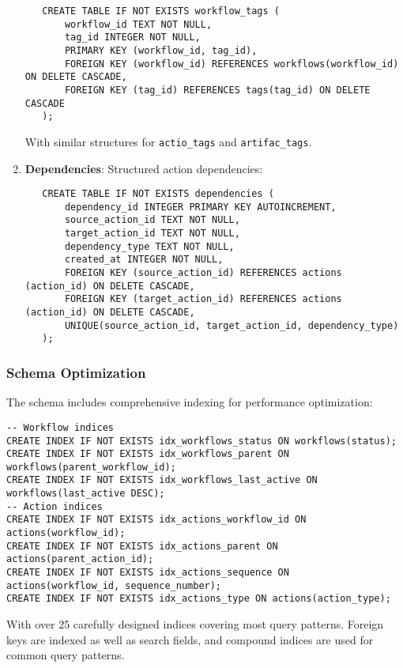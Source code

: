 \documentclass[12pt,a4paper]{article}
\newcommand{\code}[1]{\texttt{#1}}
\begin{document}
\begin{enumerate}[label=\arabic*.]
\begin{pageablecode}
\begin{verbatim}
   CREATE TABLE IF NOT EXISTS workflow_tags (
       workflow_id TEXT NOT NULL,
       tag_id INTEGER NOT NULL,
       PRIMARY KEY (workflow_id, tag_id),
       FOREIGN KEY (workflow_id) REFERENCES workflows(workflow_id) ON DELETE CASCADE,
       FOREIGN KEY (tag_id) REFERENCES tags(tag_id) ON DELETE CASCADE
   );
    \end{verbatim}
    \end{pageablecode}
    With similar structures for \code{actio\1\_tags} and \code{artifac\1\_tags}.

    \item \textbf{Dependencies}: Structured action dependencies:
    \begin{pageablecode}
    \begin{verbatim}
   CREATE TABLE IF NOT EXISTS dependencies (
       dependency_id INTEGER PRIMARY KEY AUTOINCREMENT,
       source_action_id TEXT NOT NULL,
       target_action_id TEXT NOT NULL,
       dependency_type TEXT NOT NULL,
       created_at INTEGER NOT NULL,
       FOREIGN KEY (source_action_id) REFERENCES actions (action_id) ON DELETE CASCADE,
       FOREIGN KEY (target_action_id) REFERENCES actions (action_id) ON DELETE CASCADE,
       UNIQUE(source_action_id, target_action_id, dependency_type)
   );
    \end{verbatim}
    \end{pageablecode}
\end{enumerate}

\subsubsection*{Schema Optimization}

The schema includes comprehensive indexing for performance optimization:
\begin{pageablecode}
\begin{verbatim}
-- Workflow indices
CREATE INDEX IF NOT EXISTS idx_workflows_status ON workflows(status);
CREATE INDEX IF NOT EXISTS idx_workflows_parent ON workflows(parent_workflow_id);
CREATE INDEX IF NOT EXISTS idx_workflows_last_active ON workflows(last_active DESC);
-- Action indices
CREATE INDEX IF NOT EXISTS idx_actions_workflow_id ON actions(workflow_id);
CREATE INDEX IF NOT EXISTS idx_actions_parent ON actions(parent_action_id);
CREATE INDEX IF NOT EXISTS idx_actions_sequence ON actions(workflow_id, sequence_number);
CREATE INDEX IF NOT EXISTS idx_actions_type ON actions(action_type);
\end{verbatim}
\end{pageablecode}
With over 25 carefully designed indices covering most query patterns. Foreign keys are indexed as well as search fields, and compound indices are used for common query patterns.
\end{document}

